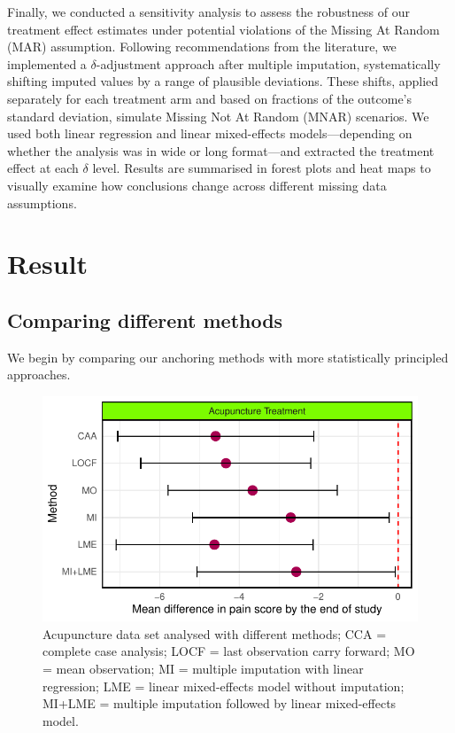 \documentclass{article}
\newcommand{\pandocbounded}[1]{#1}
\begin{document}
Finally, we conducted a sensitivity analysis to assess the robustness of
our treatment effect estimates under potential violations of the Missing
At Random (MAR) assumption. Following recommendations from the
literature, we implemented a \(\delta\)-adjustment approach after
multiple imputation, systematically shifting imputed values by a range
of plausible deviations. These shifts, applied separately for each
treatment arm and based on fractions of the outcome's standard
deviation, simulate Missing Not At Random (MNAR) scenarios. We used both
linear regression and linear mixed-effects models---depending on whether
the analysis was in wide or long format---and extracted the treatment
effect at each \(\delta\) level. Results are summarised in forest plots
and heat maps to visually examine how conclusions change across
different missing data assumptions.

\newpage

\section{Result}\label{result}

\subsection{Comparing different
methods}\label{comparing-different-methods}

We begin by comparing our anchoring methods with more statistically
principled approaches.

\begin{figure}
\centering
\pandocbounded{\includegraphics[keepaspectratio]{Final_Report_files/figure-latex/unnamed-chunk-25-1.pdf}}
\caption{Acupuncture data set analysed with different methods; CCA =
complete case analysis; LOCF = last observation carry forward; MO = mean
observation; MI = multiple imputation with linear regression; LME =
linear mixed-effects model without imputation; MI+LME = multiple
imputation followed by linear mixed-effects model.}
\end{figure}
\end{document}
